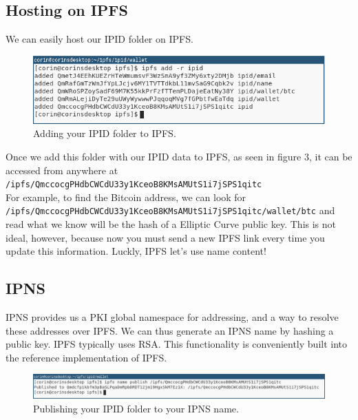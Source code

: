 \documentclass{article}
\begin{document}
\subsection{Hosting on IPFS}

We can easily host our IPID folder on IPFS.

\begin{figure}[h]
  \centering
  \includegraphics[width=.9\textwidth]{resources/profile_to_ipfs.png}
  \caption{Adding your IPID folder to IPFS.}
\end{figure}

Once we add this folder with our IPID data to IPFS, as seen in figure 3, it can be accessed from anywhere at \\
  \texttt{/ipfs/QmccocgPHdbCWCdU33y1KceoB8KMsAMUtS1i7jSPS1qitc} \\ 
For example, to find the Bitcoin address, we can look for \\
  \texttt{/ipfs/QmccocgPHdbCWCdU33y1KceoB8KMsAMUtS1i7jSPS1qitc/wallet/btc} 
and read what we know will be the hash of a Elliptic Curve public key.  
This is not ideal, however, because now you must send a new IPFS link every time you update this information. Luckly, IPFS let's use name content! 

\subsection{IPNS}

IPNS provides us a PKI global namespace for addressing, and a way to resolve these addresses over IPFS. We can thus generate an IPNS name by hashing a public key. IPFS typically uses RSA. This functionality is conveniently built into the reference implementation of IPFS. 

\begin{figure}[h]
  \hspace*{-2cm}
  \centering
  \includegraphics[width=.75\paperwidth]{resources/publish_profile.png}
  \caption{Publishing your IPID folder to your IPNS name.}
\end{figure}
\end{document}
